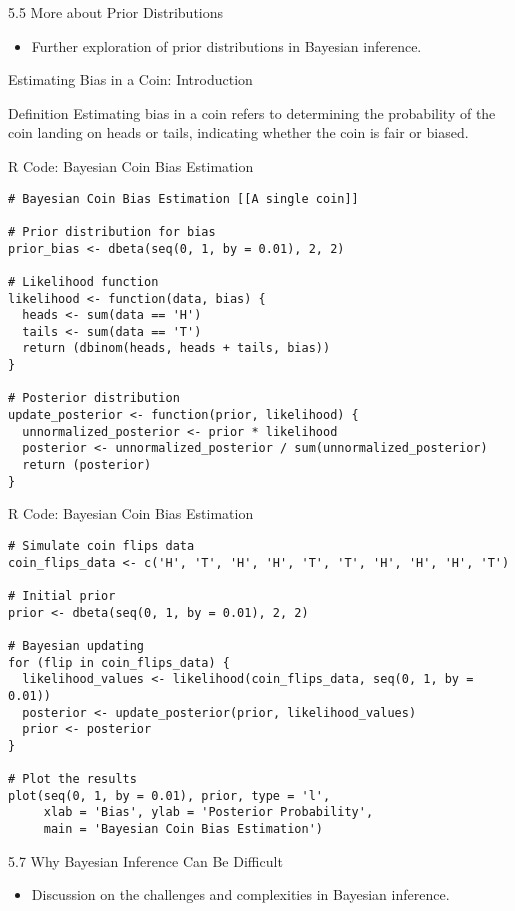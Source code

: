 \documentclass{beamer}
\begin{document}
\begin{frame}{5.5 More about Prior Distributions}
  \begin{itemize}
    \item Further exploration of prior distributions in Bayesian inference.
  \end{itemize}
\end{frame}


\begin{frame}{Estimating Bias in a Coin: Introduction}
  \begin{block}{Definition}
    Estimating bias in a coin refers to determining the probability of the coin landing on heads or tails, indicating whether the coin is fair or biased.
  \end{block}
\end{frame}

\begin{frame}[fragile]{R Code: Bayesian Coin Bias Estimation}
\begin{verbatim}
# Bayesian Coin Bias Estimation [[A single coin]]

# Prior distribution for bias
prior_bias <- dbeta(seq(0, 1, by = 0.01), 2, 2)

# Likelihood function
likelihood <- function(data, bias) {
  heads <- sum(data == 'H')
  tails <- sum(data == 'T')
  return (dbinom(heads, heads + tails, bias))
}

# Posterior distribution
update_posterior <- function(prior, likelihood) {
  unnormalized_posterior <- prior * likelihood
  posterior <- unnormalized_posterior / sum(unnormalized_posterior)
  return (posterior)
}
\end{verbatim}
\end{frame}

\begin{frame}[fragile]{R Code: Bayesian Coin Bias Estimation}
\begin{verbatim}
# Simulate coin flips data
coin_flips_data <- c('H', 'T', 'H', 'H', 'T', 'T', 'H', 'H', 'H', 'T')

# Initial prior
prior <- dbeta(seq(0, 1, by = 0.01), 2, 2)

# Bayesian updating
for (flip in coin_flips_data) {
  likelihood_values <- likelihood(coin_flips_data, seq(0, 1, by = 0.01))
  posterior <- update_posterior(prior, likelihood_values)
  prior <- posterior
}

# Plot the results
plot(seq(0, 1, by = 0.01), prior, type = 'l', 
     xlab = 'Bias', ylab = 'Posterior Probability',
     main = 'Bayesian Coin Bias Estimation')
\end{verbatim}
\end{frame}

\begin{frame}{5.7 Why Bayesian Inference Can Be Difficult}
  \begin{itemize}
    \item Discussion on the challenges and complexities in Bayesian inference.
  \end{itemize}
\end{frame}
\end{document}
